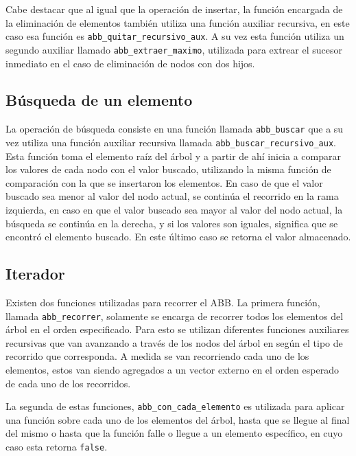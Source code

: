 \documentclass[titlepage,a4paper]{article}
\begin{document}
Cabe destacar que al igual que la operación de insertar, la función encargada
de la eliminación de elementos también utiliza una función auxiliar recursiva,
en este caso esa función es \lstinline{abb_quitar_recursivo_aux}. A su vez esta
función utiliza un segundo auxiliar llamado \lstinline{abb_extraer_maximo},
utilizada para extrear el sucesor inmediato en el caso de eliminación de nodos
con dos hijos.


											\subsection{Búsqueda de un elemento}

La operación de búsqueda consiste en una función llamada \lstinline{abb_buscar}
que a su vez utiliza una función auxiliar recursiva llamada
\lstinline{abb_buscar_recursivo_aux}. Esta función toma el elemento raíz del
árbol y a partir de ahí inicia a comparar los valores de cada nodo con el
valor buscado, utilizando la misma función de comparación con la que se
insertaron los elementos. En caso de que el valor buscado sea menor al valor
del nodo actual, se continúa el recorrido en la rama izquierda, en caso en que
el valor buscado sea mayor al valor del nodo actual, la búsqueda se continúa en
la derecha, y si los valores son iguales, significa que se encontró el elemento
buscado. En este último caso se retorna el valor almacenado.


											\subsection{Iterador}

Existen dos funciones utilizadas para recorrer el ABB. La primera función,
llamada \lstinline{abb_recorrer}, solamente se encarga de recorrer todos los
elementos del árbol en el orden especificado. Para esto se utilizan
diferentes funciones auxiliares recursivas que van avanzando a través de los
nodos del árbol en según el tipo de recorrido que corresponda. A medida se van
recorriendo cada uno de los elementos, estos van siendo agregados a un vector
externo en el orden esperado de cada uno de los recorridos.

La segunda de estas funciones, \lstinline{abb_con_cada_elemento} es utilizada
para aplicar una función sobre cada uno de los elementos del árbol, hasta que se
llegue al final del mismo o hasta que la función falle o llegue a un elemento
específico, en cuyo caso esta retorna \lstinline{false}.
\end{document}
